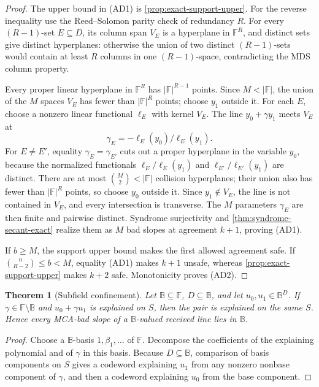 \documentclass[11pt,a4paper]{amsart}
\numberwithin{equation}{section}
\newtheorem{theorem}{Theorem}[section]
\theoremstyle{remark}
\newcommand{\F}{\mathbb F}
\newcommand{\B}{\mathbb B}
\newcommand{\abs}[1]{\lvert #1\rvert}
\begin{document}
\begin{proof}
The upper bound in \textup{(AD1)} is
\cref{prop:exact-support-upper}.  For the reverse inequality use the
Reed--Solomon parity check of redundancy \(R\).  For every
\((R-1)\)-set \(E\subseteq D\), its column span \(V_E\) is a hyperplane
in \(\F^R\), and distinct sets give distinct hyperplanes: otherwise the
union of two distinct \((R-1)\)-sets would contain at least \(R\) columns
in one \((R-1)\)-space, contradicting the MDS column property.

Every proper linear hyperplane in \(\F^R\) has
\(\abs{\F}^{R-1}\) points.  Since \(M<\abs\F\), the union of the \(M\)
spaces \(V_E\) has fewer than \(\abs{\F}^{R}\) points; choose \(y_1\)
outside it.  For each \(E\),
choose a nonzero linear functional \(\ell_E\) with kernel \(V_E\).
The line \(y_0+\gamma y_1\) meets \(V_E\) at
\[
                 \gamma_E=-\ell_E(y_0)/\ell_E(y_1).
\]
For \(E\ne E'\), equality \(\gamma_E=\gamma_{E'}\) cuts out a proper
hyperplane in the variable \(y_0\), because the normalized functionals
\(\ell_E/\ell_E(y_1)\) and
\(\ell_{E'}/\ell_{E'}(y_1)\) are distinct.  There are at most
\(\binom M2<\abs\F\) collision hyperplanes; their union also has fewer
than \(\abs{\F}^{R}\) points, so choose \(y_0\) outside it.  Since
\(y_1\notin V_E\), the line is not contained in \(V_E\), and every
intersection is transverse.  The \(M\) parameters \(\gamma_E\) are then
finite and pairwise distinct.  Syndrome surjectivity and
\cref{thm:syndrome-secant-exact} realize them as \(M\) bad slopes at
agreement \(k+1\), proving \textup{(AD1)}.

If \(b\ge M\), the support upper bound makes the first allowed agreement
safe.  If \(\binom n{R-2}\le b<M\), equality \textup{(AD1)} makes
\(k+1\) unsafe, whereas
\cref{prop:exact-support-upper} makes \(k+2\) safe.  Monotonicity proves
\textup{(AD2)}.
\end{proof}

\begin{theorem}[Subfield confinement]\label{thm:subfield-confinement-full}
Let \(\B\subseteq\F\), \(D\subseteq\B\), and let \(u_0,u_1\in\B^D\).  If
\(\gamma\in\F\setminus\B\) and \(u_0+\gamma u_1\) is explained on \(S\),
then the pair is explained on the same \(S\).  Hence every MCA-bad slope of
a \(\B\)-valued received line lies in \(\B\).
\end{theorem}

\begin{proof}
Choose a \(\B\)-basis \(1,\beta_1,\ldots\) of \(\F\).  Decompose the
coefficients of the explaining polynomial and of \(\gamma\) in this basis.
Because \(D\subseteq\B\), comparison of basis components on \(S\) gives a
codeword explaining \(u_1\) from any nonzero nonbase component of
\(\gamma\), and then a codeword explaining \(u_0\) from the base component.
\end{proof}
\end{document}
